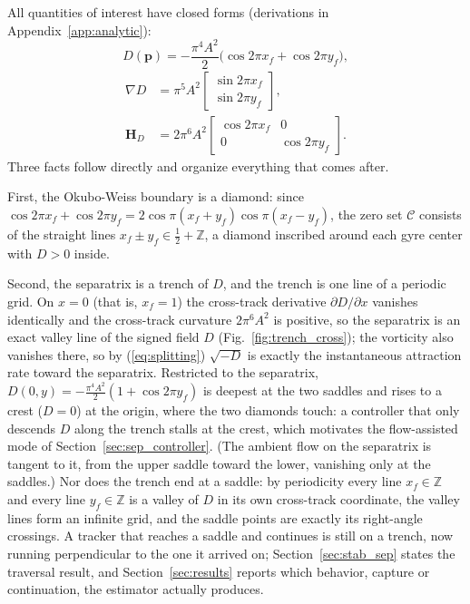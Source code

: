 \documentclass[lettersize,journal]{IEEEtran}
\begin{document}
All quantities of interest have closed forms (derivations in
Appendix~\ref{app:analytic}):
\begin{equation}
    D(\mathbf{p}) = -\frac{\pi^4 A^2}{2}
    \bigl(\cos 2\pi x_f + \cos 2\pi y_f\bigr),
    \label{eq:det_analytic_main}
\end{equation}
\begin{equation}
    \begin{aligned}
    \nabla D &= \pi^5 A^2
    \begin{bmatrix} \sin 2\pi x_f \\ \sin 2\pi y_f \end{bmatrix},
    \\
    \mathbf{H}_D &= 2\pi^6 A^2
    \begin{bmatrix} \cos 2\pi x_f & 0 \\ 0 & \cos 2\pi y_f \end{bmatrix}.
    \end{aligned}
    \label{eq:gradhess_analytic_main}
\end{equation}
Three facts follow directly and organize everything that comes after.

First, the Okubo-Weiss boundary is a diamond: since $\cos 2\pi x_f +
\cos 2\pi y_f = 2\cos\pi(x_f + y_f)\cos\pi(x_f - y_f)$, the zero set
$\mathcal{C}$ consists of the straight lines $x_f \pm y_f \in
\tfrac{1}{2} + \mathbb{Z}$, a diamond inscribed around each gyre center
with $D > 0$ inside.

Second, the separatrix is a trench of $D$, and the trench is one line
of a periodic grid. On $x = 0$ (that is, $x_f = 1$) the cross-track
derivative $\partial D/\partial x$ vanishes identically and the
cross-track curvature $2\pi^6 A^2$ is positive, so the separatrix is an
exact valley line of the signed field $D$
(Fig.~\ref{fig:trench_cross}); the vorticity also vanishes there, so by
(\ref{eq:splitting}) $\sqrt{-D}$ is exactly the instantaneous
attraction rate toward the separatrix. Restricted to the separatrix,
$D(0, y) = -\tfrac{\pi^4 A^2}{2}(1 + \cos 2\pi y_f)$ is deepest at the
two saddles and rises to a crest ($D = 0$) at the origin, where the two
diamonds touch: a controller that only descends $D$ along the trench
stalls at the crest, which motivates the flow-assisted mode of
Section~\ref{sec:sep_controller}. (The ambient flow on the separatrix
is tangent to it, from the upper saddle toward the lower, vanishing
only at the saddles.) Nor does the trench end at a saddle: by
periodicity every line $x_f \in \mathbb{Z}$ and every line $y_f \in
\mathbb{Z}$ is a valley of $D$ in its own cross-track coordinate, the
valley lines form an infinite grid, and the saddle points are exactly
its right-angle crossings. A tracker that reaches a saddle and
continues is still on a trench, now running perpendicular to the one it
arrived on; Section~\ref{sec:stab_sep} states the traversal result, and
Section~\ref{sec:results} reports which behavior, capture or
continuation, the estimator actually produces.
\end{document}
